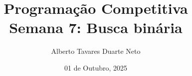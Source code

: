 \documentclass{beamer}
\title{{\Large Programação Competitiva}\\ Semana 7: Busca binária}
\date{01 de Outubro, 2025}
\author{Alberto Tavares Duarte Neto}
\institute{Universidade de Brasília}
\numberwithin{equation}{subsection}
\begin{document}
    \maketitle
    \small

    
    
    
    
    
    
    
    
\end{document}
